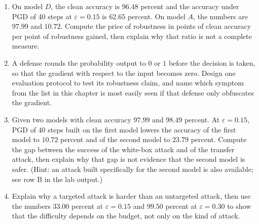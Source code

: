 \begin{latihan}
\begin{enumerate}
  \item On model $D$, the clean accuracy is $96.48$ percent and the accuracy under PGD
        of 40 steps at $\varepsilon=0.15$ is $62.65$ percent. On model $A$,
        the numbers are $97.99$ and $10.72$. Compute the price of robustness in
        points of clean accuracy per point of robustness gained, then explain why that
        ratio is not a complete measure.

  \item A defense rounds the probability output to $0$ or $1$
        before the decision is taken, so that the gradient with respect to the input
        becomes zero. Design one evaluation protocol to test its robustness claim, and
        name which symptom from the list in this chapter is most easily seen if that
        defense only obfuscates the gradient.

  \item Given two models with clean accuracy $97.99$ and $98.49$ percent.
        At $\varepsilon=0.15$, PGD of 40 steps built on the first model lowers
        the accuracy of the first model to $10.72$ percent and of the second model to
        $23.79$ percent. Compute the gap between the success of the white-box attack
        and of the transfer attack, then explain why that gap is not evidence that the
        second model is safer. (Hint: an attack built specifically for the second model
        is also available; see row B in the lab output.)

  \item Explain why a targeted attack is harder than an untargeted
        attack, then use the numbers $33.00$ percent at $\varepsilon=0.15$ and
        $99.50$ percent at $\varepsilon=0.30$ to show that the difficulty
        depends on the budget, not only on the kind of attack.
\end{enumerate}
\end{latihan}

